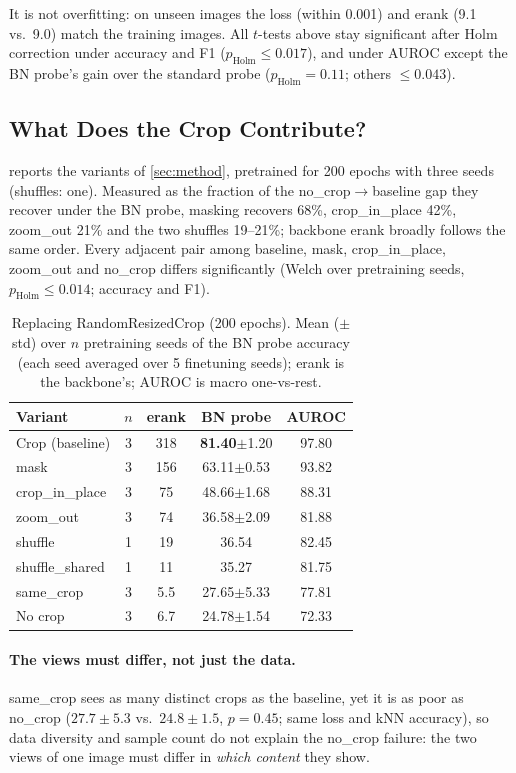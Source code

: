 \documentclass[10pt,twocolumn,letterpaper]{article}
\newcommand{\pmstd}[1]{{\scriptsize$\pm$#1}}
\begin{document}
It is not overfitting: on unseen images the loss (within 0.001) and erank (9.1 vs.\ 9.0) match the training images.
All $t$-tests above stay significant after Holm correction under accuracy and F1 ($p_\text{Holm}\le0.017$), and under AUROC except the BN probe's gain over the standard probe ($p_\text{Holm}{=}0.11$; others $\le0.043$).

\subsection{What Does the Crop Contribute?}
\label{sec:exp_crop}


 reports the variants of \cref{sec:method}, pretrained for 200 epochs with three seeds (shuffles: one).
Measured as the fraction of the no\_crop$\to$baseline gap they recover under the BN probe, masking recovers 68\%, crop\_in\_place 42\%, zoom\_out 21\% and the two shuffles 19--21\%; backbone erank broadly follows the same order.
Every adjacent pair among baseline, mask, crop\_in\_place, zoom\_out and no\_crop differs significantly (Welch over pretraining seeds, $p_\text{Holm}\le0.014$; accuracy and F1).

\begin{table}[t]
\centering
\small
\setlength\tabcolsep{3pt}
\begin{tabular}{lcccc}
\toprule
Variant & $n$ & erank & BN probe & AUROC \\
\midrule
Crop (baseline) & 3 & 318 & \textbf{81.40}\pmstd{1.20} & 97.80 \\
mask & 3 & 156 & 63.11\pmstd{0.53} & 93.82 \\
crop\_in\_place & 3 & 75 & 48.66\pmstd{1.68} & 88.31 \\
zoom\_out & 3 & 74 & 36.58\pmstd{2.09} & 81.88 \\
shuffle & 1 & 19 & 36.54 & 82.45 \\
shuffle\_shared & 1 & 11 & 35.27 & 81.75 \\
same\_crop & 3 & 5.5 & 27.65\pmstd{5.33} & 77.81 \\
No crop & 3 & 6.7 & 24.78\pmstd{1.54} & 72.33 \\
\bottomrule
\end{tabular}
\caption{Replacing RandomResizedCrop (200 epochs). Mean (\pmstd{std}) over $n$ pretraining seeds of the BN probe accuracy (each seed averaged over 5 finetuning seeds); erank is the backbone's; AUROC is macro one-vs-rest.}
\label{tab:crop}
\end{table}

\paragraph{The views must differ, not just the data.}
same\_crop sees as many distinct crops as the baseline, yet it is as poor as no\_crop ($27.7\pm5.3$ vs.\ $24.8\pm1.5$, $p{=}0.45$; same loss and kNN accuracy), so data diversity and sample count do not explain the no\_crop failure: the two views of one image must differ in \emph{which content} they show.
\end{document}
